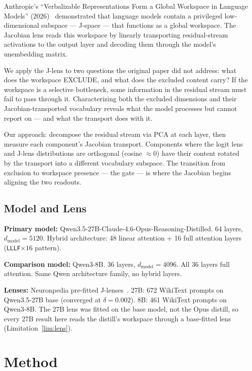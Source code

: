 \documentclass[11pt,a4paper]{article}
\begin{document}
Anthropic's ``Verbalizable Representations Form a Global Workspace in Language Models'' (2026)~\cite{anthropic2026} demonstrated that language models contain a privileged low-dimensional subspace --- J-space --- that functions as a global workspace. The Jacobian lens reads this workspace by linearly transporting residual-stream activations to the output layer and decoding them through the model's unembedding matrix.

We apply the J-lens to two questions the original paper did not address: what does the workspace EXCLUDE, and what does the excluded content carry? If the workspace is a selective bottleneck, some information in the residual stream must fail to pass through it. Characterizing both the excluded dimensions and their Jacobian-transported vocabulary reveals what the model processes but cannot report on --- and what the transport does with it.

Our approach: decompose the residual stream via PCA at each layer, then measure each component's Jacobian transport. Components where the logit lens and J-lens distributions are orthogonal (cosine $\approx 0$) have their content rotated by the transport into a different vocabulary subspace. The transition from exclusion to workspace presence --- the gate --- is where the Jacobian begins aligning the two readouts.

\subsection{Model and Lens}

\textbf{Primary model:} Qwen3.5-27B-Claude-4.6-Opus-Reasoning-Distilled. 64 layers, $d_{\text{model}} = 5120$. Hybrid architecture: 48 linear attention + 16 full attention layers (\texttt{LLLF}${\times}16$ pattern).

\textbf{Comparison model:} Qwen3-8B. 36 layers, $d_{\text{model}} = 4096$. All 36 layers full attention. Same Qwen architecture family, no hybrid layers.

\textbf{Lenses:} Neuronpedia pre-fitted J-lenses~\cite{neuronpedia2026}. 27B: 672 WikiText prompts on Qwen3.5-27B base (converged at $\delta = 0.002$). 8B: 461 WikiText prompts on Qwen3-8B. The 27B lens was fitted on the base model, not the Opus distill, so every 27B result here reads the distill's workspace through a base-fitted lens (Limitation~\ref{lim:lens}).

\section{Method}
\end{document}

